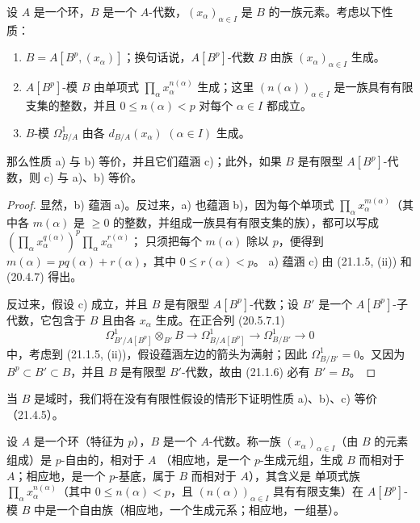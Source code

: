 \begin{proposition}[21.1.7]
\label{0.21.1.7-fr}
设 $A$ 是一个环，$B$ 是一个 $A$-代数，$(x_\alpha)_{\alpha\in I}$ 是 $B$
的一族元素。考虑以下性质：
\begin{enumerate}
  \item[a)] $B=A[B^p,(x_\alpha)]$；换句话说，$A[B^p]$-代数 $B$ 由族
  $(x_\alpha)_{\alpha\in I}$ 生成。
  \item[b)] $A[B^p]$-模 $B$ 由单项式
  $\prod_\alpha x_\alpha^{n(\alpha)}$ 生成；这里
  $(n(\alpha))_{\alpha\in I}$ 是一族具有有限支集的整数，并且
  $0\leq n(\alpha)<p$ 对每个 $\alpha\in I$ 都成立。
  \item[c)] $B$-模 $\Omega^1_{B/A}$ 由各
  $d_{B/A}(x_\alpha)$ $(\alpha\in I)$ 生成。
\end{enumerate}
那么性质 a) 与 b) 等价，并且它们蕴涵 c)；此外，如果 $B$ 是有限型
$A[B^p]$-代数，则 c) 与 a)、b) 等价。
\end{proposition}

\begin{proof}
显然，b) 蕴涵 a)。反过来，a) 也蕴涵 b)，因为每个单项式
$\prod_\alpha x_\alpha^{m(\alpha)}$（其中各 $m(\alpha)$ 是
$\geq0$ 的整数，并组成一族具有有限支集的族），都可以写成
$(\prod_\alpha x_\alpha^{q(\alpha)})^p\prod_\alpha x_\alpha^{r(\alpha)}$；
只须把每个 $m(\alpha)$ 除以 $p$，便得到
$m(\alpha)=p q(\alpha)+r(\alpha)$，其中 $0\leq r(\alpha)<p$。
a) 蕴涵 c) 由 (21.1.5, (ii)) 和 (20.4.7) 得出。

反过来，假设 c) 成立，并且 $B$ 是有限型 $A[B^p]$-代数；设 $B'$ 是一个
$A[B^p]$-子代数，它包含于 $B$ 且由各 $x_\alpha$ 生成。在正合列 (20.5.7.1)
\[
\Omega^1_{B'/A[B^p]}\otimes_{B'}B\longrightarrow
\Omega^1_{B/A[B^p]}\longrightarrow\Omega^1_{B/B'}\longrightarrow0
\]
中，考虑到 (21.1.5, (ii))，假设蕴涵左边的箭头为满射；因此
$\Omega^1_{B/B'}=0$。又因为 $B^p\subset B'\subset B$，并且 $B$ 是有限型
$B'$-代数，故由 (21.1.6) 必有 $B'=B$。
\end{proof}

\begin{remark}[21.1.8]
\label{0.21.1.8-fr}
当 $B$ 是域时，我们将在没有有限性假设的情形下证明性质 a)、b)、c) 等价
（21.4.5）。
\end{remark}

\begin{definition}[21.1.9]
\label{0.21.1.9-fr}
设 $A$ 是一个环（特征为 $p$），$B$ 是一个 $A$-代数。称一族
$(x_\alpha)_{\alpha\in I}$（由 $B$ 的元素组成）是 $p$-自由的，相对于 $A$
（相应地，是一个 $p$-生成元组，生成 $B$ 而相对于 $A$；相应地，是一个
$p$-基底，属于 $B$ 而相对于 $A$），其含义是
单项式族 $\prod_\alpha x_\alpha^{n(\alpha)}$（其中
$0\leq n(\alpha)<p$，且 $(n(\alpha))_{\alpha\in I}$ 具有有限支集）在
$A[B^p]$-模 $B$ 中是一个自由族（相应地，一个生成元系；相应地，一组基）。
\end{definition}

